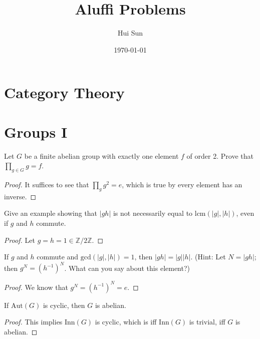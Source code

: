 \documentclass[openany]{book}
\title{Aluffi Problems}
\date{\today}
\author{Hui Sun}
\newcommand{\Z}{\mathbb{Z}}
\begin{document}
\maketitle

\tableofcontents
\newpage

\chapter{Category Theory}

\chapter{Groups I}

\begin{prob}[1.8]
    Let \( G \) be a finite abelian group with exactly one element \( f \) of order 2. Prove that \(\prod_{g \in G} g = f\).
\end{prob}
\begin{proof}
    It suffices to see that $\prod_gg^2=e$, which is true by every element has an inverse.
\end{proof}










\begin{prob}[1.13]
    Give an example showing that \( |gh| \) is not necessarily equal to \( \text{lcm}(|g|, |h|) \), even if \( g \) and \( h \) commute.
\end{prob}
\begin{proof}
    Let $g=h=1\in\Z/2\Z$.
\end{proof}

\begin{prob}[1.14]
    If \( g \) and \( h \) commute and \( \text{gcd}(|g|, |h|) = 1 \), then \( |gh| = |g||h| \). (Hint: Let \( N = |gh| \); then \( g^N = (h^{-1})^N \). What can you say about this element?)
\end{prob}
\begin{proof}
    We know that $g^N = (h^{-1})^N=e$.
\end{proof}

\begin{prob}[6.7]
    If $\mathrm{Aut}(G)$ is cyclic, then $G$ is abelian.
\end{prob}
\begin{proof}
    This implies $\text{Inn}(G)$ is cyclic, which is iff $\text{Inn}(G)$ is trivial, iff $G$ is abelian.
\end{proof}
\end{document}
